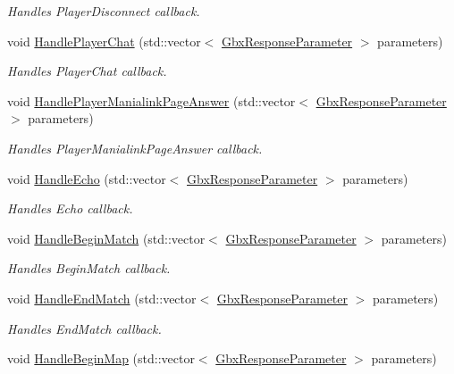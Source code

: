 \begin{DoxyCompactItemize}
\begin{DoxyCompactList}\small\item\em Handles Player\-Disconnect callback. \end{DoxyCompactList}\item 
void \hyperlink{classCallBackManager_a0919197cbeeb3c5a12230d44109a2cdb}{Handle\-Player\-Chat} (std\-::vector$<$ \hyperlink{classGbxResponseParameter}{Gbx\-Response\-Parameter} $>$ parameters)
\begin{DoxyCompactList}\small\item\em Handles Player\-Chat callback. \end{DoxyCompactList}\item 
void \hyperlink{classCallBackManager_af4fcbb46d5e88bfdf34185b1d0c7d836}{Handle\-Player\-Manialink\-Page\-Answer} (std\-::vector$<$ \hyperlink{classGbxResponseParameter}{Gbx\-Response\-Parameter} $>$ parameters)
\begin{DoxyCompactList}\small\item\em Handles Player\-Manialink\-Page\-Answer callback. \end{DoxyCompactList}\item 
void \hyperlink{classCallBackManager_a75f7f6d423799a89d9988b23a22bed18}{Handle\-Echo} (std\-::vector$<$ \hyperlink{classGbxResponseParameter}{Gbx\-Response\-Parameter} $>$ parameters)
\begin{DoxyCompactList}\small\item\em Handles Echo callback. \end{DoxyCompactList}\item 
void \hyperlink{classCallBackManager_ad741782611d10c7a67e6d1a8630cc605}{Handle\-Begin\-Match} (std\-::vector$<$ \hyperlink{classGbxResponseParameter}{Gbx\-Response\-Parameter} $>$ parameters)
\begin{DoxyCompactList}\small\item\em Handles Begin\-Match callback. \end{DoxyCompactList}\item 
void \hyperlink{classCallBackManager_a1084f327bacd054c1a8204e3f5e90ccb}{Handle\-End\-Match} (std\-::vector$<$ \hyperlink{classGbxResponseParameter}{Gbx\-Response\-Parameter} $>$ parameters)
\begin{DoxyCompactList}\small\item\em Handles End\-Match callback. \end{DoxyCompactList}\item 
void \hyperlink{classCallBackManager_a0a106f538862503a6c5b268a75d18e7a}{Handle\-Begin\-Map} (std\-::vector$<$ \hyperlink{classGbxResponseParameter}{Gbx\-Response\-Parameter} $>$ parameters)

\end{DoxyCompactItemize}
